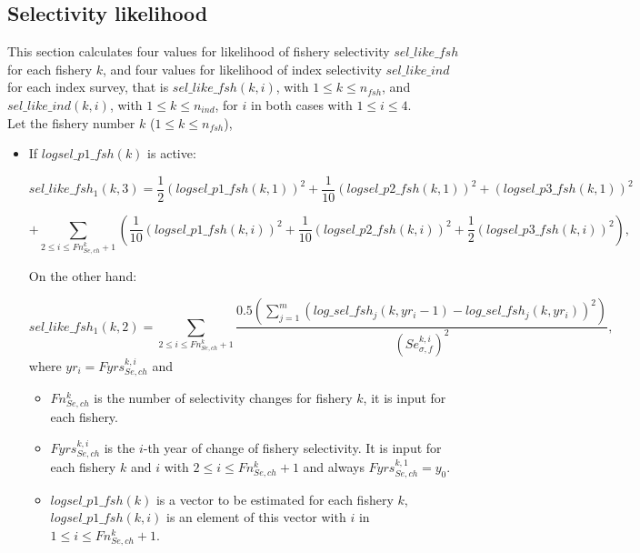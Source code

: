 \documentclass{article}
\begin{document}
\subsection{Selectivity likelihood}

This section calculates four values for likelihood of fishery selectivity $sel\_like\_fsh$ for each fishery $k$, and four values for likelihood of index selectivity $sel\_like\_ind$ for each index survey, that is $sel\_like\_fsh(k,i)$, with $1\leq k \leq n_{fsh}$, and  $sel\_like\_ind(k,i)$, with $1\leq k \leq n_{ind}$, for $i$ in both cases with $1\leq i \leq 4$.\\

Let the fishery number $k$ ($1\leq k \leq n_{fsh}$),

\begin{itemize}
    \item If $logsel\_p1\_fsh(k)$ is active: 

\begin{equation}
sel\_like\_fsh_1(k,3)= \dfrac{1}{2}(logsel\_p1\_fsh(k,1))^2+\dfrac{1}{10}(logsel\_p2\_fsh(k,1))^2+(logsel\_p3\_fsh(k,1))^2
\end{equation}

\begin{equation*}
    +\sum_{2\leq i \leq Fn_{Se,ch}^k+1}\left(\dfrac{1}{10}( logsel\_p1\_fsh(k,i))^2+\dfrac{1}{10}(logsel\_p2\_fsh(k,i))^2+ \dfrac{1}{2}(logsel\_p3\_fsh(k,i))^2\right),
\end{equation*}

On the other hand:

\begin{equation}
    sel\_like\_fsh_1(k,2)=\sum_{2\leq i \leq Fn_{Se,ch}^k+1}\dfrac{0.5 \displaystyle\left(\sum_{j=1}^m(log\_sel\_fsh_j(k,yr_i-1)-log\_sel\_fsh_j(k,yr_i))^2\right)}{(Se_{\sigma,f}^{k,i})^2},
\end{equation}
where $yr_i=Fyrs_{Se,ch}^{k,i}$ and 
\begin{itemize}
     \item $Fn_{Se,ch}^k$ is the number of selectivity changes for fishery $k$, it is input for each fishery.
    
    \item $Fyrs_{Se,ch}^{k,i}$ is the $i$-th year of change of fishery selectivity. It is input for each fishery $k$ and $i$ with  $2\leq i \leq Fn_{Se,ch}^k+1$ and always $Fyrs_{Se,ch}^{k,1}=y_0$. 
    \item $logsel\_p1\_fsh(k)$ is a vector to be estimated for each fishery $k$, $logsel\_p1\_fsh(k,i)$ is an element of this vector with $i$ in $1\leq i \leq Fn_{Se,ch}^k+1$.
    

\end{itemize}
\end{itemize}
\end{document}
